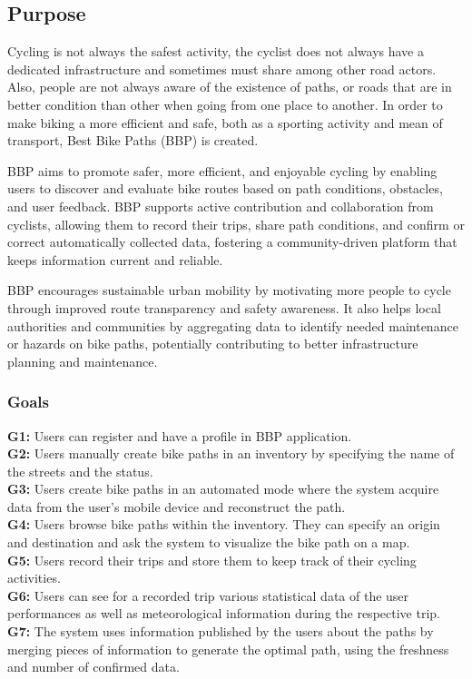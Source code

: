
\subsection{Purpose}

Cycling is not always the safest activity, the cyclist does not always have a dedicated infrastructure and sometimes must share among other road actors. Also, people are not always aware of the existence of paths, or roads that are in better condition than other when going from one place to another. In order to make biking a more efficient and safe, both as a sporting activity and mean of transport, Best Bike Paths (BBP) is created. 

BBP aims to promote safer, more efficient, and enjoyable cycling by enabling users to discover and evaluate bike routes based on path conditions, obstacles, and user feedback. BBP supports active contribution and collaboration from cyclists, allowing them to record their trips, share path conditions, and confirm or correct automatically collected data, fostering a community-driven platform that keeps information current and reliable.

BBP encourages sustainable urban mobility by motivating more people to cycle through improved route transparency and safety awareness. It also helps local authorities and communities by aggregating data to identify needed maintenance or hazards on bike paths, potentially contributing to better infrastructure planning and maintenance. 

\subsubsection{Goals}
\textbf{G1:} Users can register and have a profile in BBP application.\\
\textbf{G2:} Users manually create bike paths in an inventory by specifying the name of the streets and the status.\\
\textbf{G3:} Users create bike paths in an automated mode where the system acquire data from the user's mobile device and reconstruct the path.\\
\textbf{G4:} Users browse bike paths within the inventory. They can specify an origin and destination and ask the system to visualize the bike path on a map. \\
\textbf{G5:} Users record their trips and store them to keep track of their cycling activities.\\
\textbf{G6:} Users can see for a recorded trip various statistical data of the user performances as well as meteorological information during the respective trip.\\
\textbf{G7:} The system uses information published by the users about the paths by merging pieces of information to generate the optimal path, using the freshness and number of confirmed data.\\

